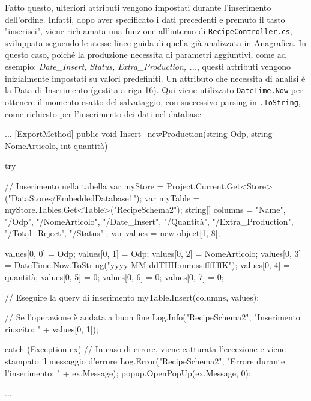 Fatto questo, ulteriori attributi vengono impostati durante l'inserimento dell'ordine. Infatti, dopo aver specificato i dati precedenti e premuto il tasto "inserisci", viene richiamata una funzione all'interno di \verb|RecipeController.cs|, sviluppata seguendo le stesse linee guida di quella già analizzata in Anagrafica. In questo caso, poiché la produzione necessita di parametri aggiuntivi, come ad esempio: \textit{Date\_Insert, Status, Extra\_Production, ...}, questi attributi vengono inizialmente impostati su valori predefiniti. Un attributo che necessita di analisi è la Data di Inserimento (gestita a riga 16). Qui viene utilizzato \verb|DateTime.Now| per ottenere il momento esatto del salvataggio, con successivo parsing in \verb|.ToString|, come richiesto per l'inserimento dei dati nel database.

\begin{csharp}
...
[ExportMethod]
public void Insert_newProduction(string Odp, string NomeArticolo, int quantità)   
{
    try
    {
        // Inserimento nella tabella
        var myStore = Project.Current.Get<Store>("DataStores/EmbeddedDatabase1");
        var myTable = myStore.Tables.Get<Table>("RecipeSchema2");
        string[] columns = { "Name", "/Odp", "/NomeArticolo", "/Date_Insert", "/Quantità", "/Extra_Production", "/Total_Reject", "/Status" };
        var values = new object[1, 8];

        values[0, 0] = Odp;
        values[0, 1] = Odp;
        values[0, 2] = NomeArticolo;
        values[0, 3] = DateTime.Now.ToString("yyyy-MM-ddTHH:mm:ss.fffffffK"); 
        values[0, 4] = quantità;
        values[0, 5] = 0;
        values[0, 6] = 0;
        values[0, 7] = 0;

        // Eseguire la query di inserimento
        myTable.Insert(columns, values);

        // Se l'operazione è andata a buon fine
        Log.Info("RecipeSchema2", "Inserimento riuscito: " + values[0, 1]);
    }
    catch (Exception ex)
    {
        // In caso di errore, viene catturata l'eccezione e viene stampato il messaggio d'errore
        Log.Error("RecipeSchema2", "Errore durante l'inserimento: " + ex.Message);
        popup.OpenPopUp(ex.Message, 0);
    }
}
...
\end{csharp}

